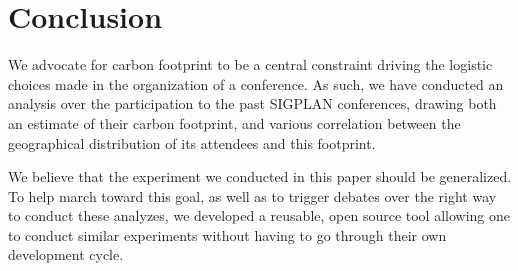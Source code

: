 \section{Conclusion}

We advocate for carbon footprint to be a central constraint driving the logistic
choices made in the organization of a conference. As such, we have conducted an
analysis over the participation to the past SIGPLAN conferences, drawing both an
estimate of their carbon footprint, and various correlation between the
geographical distribution of its attendees and this footprint.


We believe that the experiment we conducted in this paper should be generalized.
To help march toward this goal, as well as to trigger debates over the right way
to conduct these analyzes, we developed a reusable, open source tool allowing
one to conduct similar experiments without having to go through their own
development cycle.
